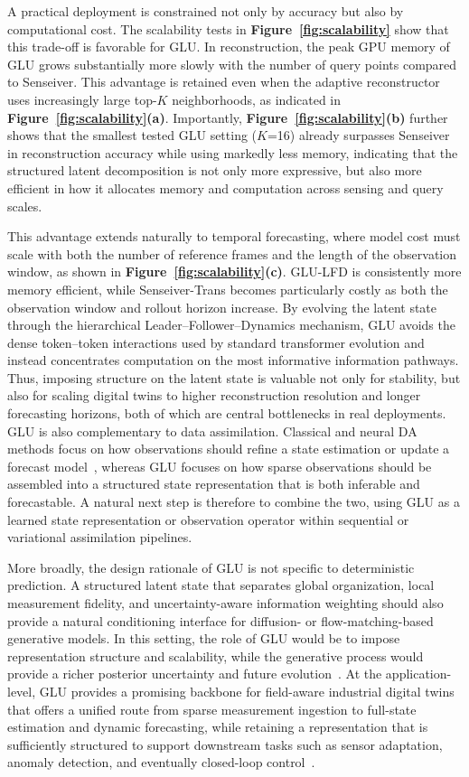 \documentclass[pdflatex,sn-nature]{sn-jnl}%
\begin{document}
A practical deployment is constrained not only by accuracy but also by computational cost. 
The scalability tests in \textbf{Figure~\ref{fig:scalability}} show that this trade-off is favorable for GLU. 
In reconstruction, the peak GPU memory of GLU grows substantially more slowly with the number of query points compared to Senseiver. This advantage is retained even when the adaptive reconstructor uses increasingly large top-$K$ neighborhoods, as indicated in \textbf{Figure~\ref{fig:scalability}(a)}. 
Importantly, \textbf{Figure~\ref{fig:scalability}(b)} further shows that the smallest tested GLU setting ($K$=16) already surpasses Senseiver in reconstruction accuracy while using markedly less memory, indicating that the structured latent decomposition is not only more expressive, but also more efficient in how it allocates memory and computation across sensing and query scales. 

This advantage extends naturally to temporal forecasting, where model cost must scale with both the number of reference frames and the length of the observation window, as shown in \textbf{Figure~\ref{fig:scalability}(c)}.
GLU-LFD is consistently more memory efficient, while Senseiver-Trans becomes particularly costly as both the observation window and rollout horizon increase. 
By evolving the latent state through the hierarchical Leader--Follower--Dynamics mechanism, GLU avoids the dense token--token interactions used by standard transformer evolution and instead concentrates computation on the most informative information pathways.
Thus, imposing structure on the latent state is valuable not only for stability, but also for scaling digital twins to higher reconstruction resolution and longer forecasting horizons, both of which are central bottlenecks in real deployments.
GLU is also complementary to data assimilation. 
Classical and neural DA methods focus on how observations should refine a state estimation or update a forecast model~\cite{Gou2024Global}, whereas GLU focuses on how sparse observations should be assembled into a structured state representation that is both inferable and forecastable. 
A natural next step is therefore to combine the two, using GLU as a learned state representation or observation operator within sequential or variational assimilation pipelines.

More broadly, the design rationale of GLU is not specific to deterministic prediction. 
A structured latent state that separates global organization, local measurement fidelity, and uncertainty-aware information weighting should also provide a natural conditioning interface for diffusion- or flow-matching-based generative models.
In this setting, the role of GLU would be to impose representation structure and scalability, while the generative process would provide a richer posterior uncertainty and future evolution~\cite{zhuang2025spatially}.
At the application-level, GLU provides a promising backbone for field-aware industrial digital twins that offers a unified route from sparse measurement ingestion to full-state estimation and dynamic forecasting, while retaining a representation that is sufficiently structured to support downstream tasks such as sensor adaptation, anomaly detection, and eventually closed-loop control~\cite{lawrence2024machine}. 
\end{document}
